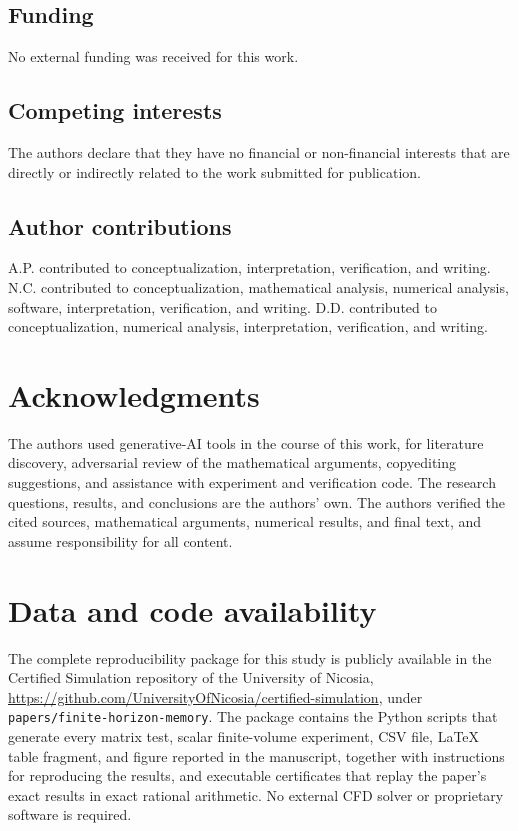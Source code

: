 \documentclass[pdflatex,sn-mathphys-num]{sn-jnl}%
\theoremstyle{thmstyleone}%
\theoremstyle{thmstyletwo}%
\theoremstyle{thmstylethree}%
\begin{document}
\subsection*{Funding}
No external funding was received for this work.

\subsection*{Competing interests}
The authors declare that they have no financial or non-financial interests
that are directly or indirectly related to the work submitted for
publication.

\subsection*{Author contributions}
A.P. contributed to conceptualization, interpretation, verification, and writing.  N.C. contributed to conceptualization, mathematical analysis, numerical analysis, software, interpretation, verification, and writing.  D.D. contributed to conceptualization, numerical analysis, interpretation, verification, and writing.

\section*{Acknowledgments}

The authors used generative-AI tools in the course of this work, for
literature discovery, adversarial review of the mathematical
arguments, copyediting suggestions, and assistance with experiment
and verification code.  The research questions, results, and
conclusions are the authors' own.  The authors verified the cited
sources, mathematical arguments, numerical results, and final text,
and assume responsibility for all content.

\section*{Data and code availability}

The complete reproducibility package for this study is publicly
available in the Certified Simulation repository of the University of
Nicosia,
\url{https://github.com/UniversityOfNicosia/certified-simulation},
under \texttt{papers/finite-horizon-memory}.  The package contains
the Python scripts that generate every matrix test, scalar
finite-volume experiment, CSV file, LaTeX table fragment, and figure
reported in the manuscript, together with instructions for
reproducing the results, and executable certificates that replay the
paper's exact results in exact rational arithmetic.  No external CFD
solver or proprietary software is required.




\end{document}
